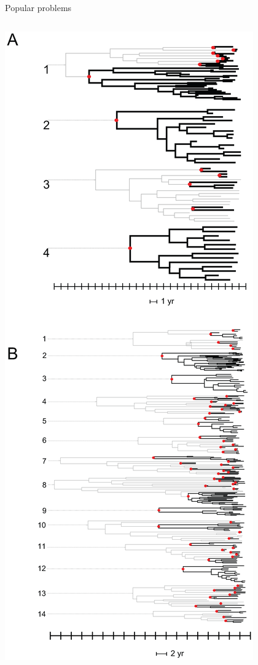 \documentclass{beamer}
\begin{document}
\begin{frame}{Popular problems}
    \begin{columns}
        \begin{column}{0.5\textwidth}
            \includegraphics[width=\textwidth, trim=0 11in 0 0, clip=true]{hughes2009molecular-f1}

\end{column}
\end{columns}
\end{frame}
\end{document}
